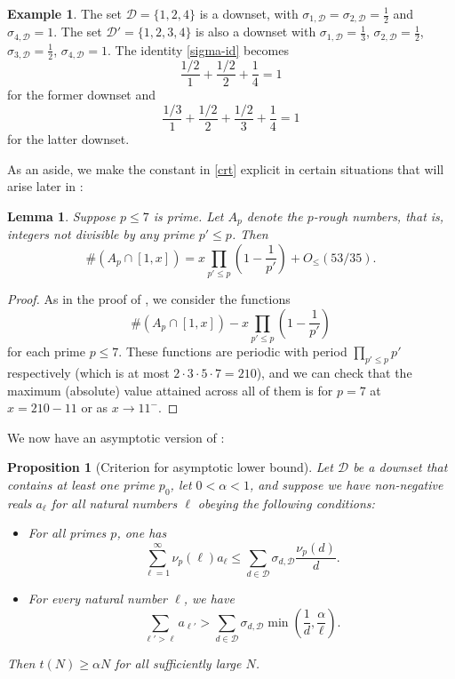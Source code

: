 \documentclass[10pt,a4paper,reqno]{amsart}
\numberwithin{equation}{section}
\theoremstyle{plain}
\newtheorem{proposition}[theorem]{Proposition}
\newtheorem{lemma}[theorem]{Lemma}
\theoremstyle{definition}
\newtheorem{example}[theorem]{Example}
\begin{document}
\begin{example}  The set ${\mathcal D} = \{1,2,4\}$ is a downset, with $\sigma_{1,{\mathcal D}} = \sigma_{2,{\mathcal D}} = \frac{1}{2}$ and $\sigma_{4,\mathcal D} = 1$.  The set ${\mathcal D}' = \{1,2,3,4\}$ is also a downset with $\sigma_{1,{\mathcal D}} = \frac{1}{3}$, $\sigma_{2,{\mathcal D}} = \frac{1}{2}$, $\sigma_{3,{\mathcal D}} = \frac{1}{2}$, $\sigma_{4,{\mathcal D}} = 1$.  The identity \eqref{sigma-id} becomes
$$ \frac{1/2}{1} + \frac{1/2}{2} + \frac{1}{4} = 1$$
for the former downset and
$$ \frac{1/3}{1} + \frac{1/2}{2} + \frac{1/2}{3} + \frac{1}{4} = 1$$
for the latter downset.
\end{example}

As an aside, we make the constant in \eqref{crt} explicit in certain situations that will arise later in :
\begin{lemma} \label{lit7}
  Suppose $p\le 7$ is prime.  Let $A_{p}$ denote the $p$-rough numbers, that is, integers not divisible by any prime $p'\le p$.  Then
  $$ \#(A_{p}\cap[1,x]) = x\prod_{p'\le p} \left(1-\frac{1}{p'}\right) + O_{\le}(53/35). $$
\end{lemma}
\begin{proof}
  As in the proof of , we consider the functions $$\#(A_{p}\cap[1,x]) - x\prod_{p'\le p} \left(1-\frac{1}{p'}\right)$$
  for each prime $p\le 7$.
  These functions are periodic with period $\prod_{p'\le p} p'$ respectively (which is at most $2\cdot 3\cdot 5\cdot 7=210$), and we can check that the maximum (absolute) value attained across all of them is for $p=7$ at $x=210-11$ or as $x\to 11^{-}$.
\end{proof}

We now have an asymptotic version of :

\begin{proposition}[Criterion for asymptotic lower bound]\label{asym-crit}  Let ${\mathcal D}$ be a downset that contains at least one prime $p_0$, let $0  < \alpha < 1$, and suppose we have non-negative reals $a_\ell$ for all natural numbers $\ell$ obeying the following conditions:
\begin{itemize}
\item[(i)]  For all primes $p$, one has
\begin{equation}\label{i-eq}
   \sum_{\ell=1}^\infty \nu_p(\ell) a_\ell  \leq \sum_{d \in {\mathcal D}} \sigma_{d,{\mathcal D}} \frac{\nu_p(d)}{d}.
\end{equation}
\item[(ii)]  For every natural number $\ell$, we have
\begin{equation}\label{l-eq} \sum_{\ell' > \ell} a_{\ell'} > \sum_{d \in {\mathcal D}} \sigma_{d,{\mathcal D}} \min\left( \frac{1}{d}, \frac{\alpha}{\ell}\right).
\end{equation}
\end{itemize}
Then $t(N) \geq \alpha N$ for all sufficiently large $N$.
\end{proposition}
\end{document}

